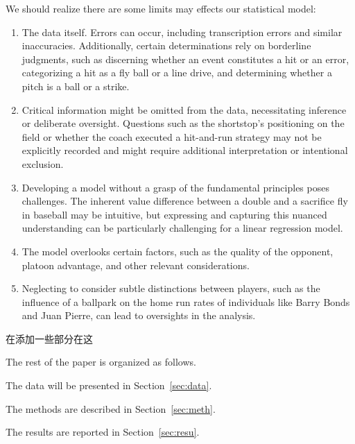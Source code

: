 \documentclass[12pt]{article}
\begin{document}
We should realize there are some limits may effects our statistical model:
\begin{enumerate}
\item The data itself. Errors can occur, including transcription errors and similar inaccuracies. Additionally, 
certain determinations rely on borderline judgments, such as discerning whether an event constitutes a hit or an
error, categorizing a hit as a fly ball or a line drive, and determining whether a pitch is a ball or a strike.

\item Critical information might be omitted from the data, necessitating inference or deliberate oversight. 
Questions such as the shortstop's positioning on the field or whether the coach executed a hit-and-run strategy may 
not be explicitly recorded and might require additional interpretation or intentional exclusion.

\item Developing a model without a grasp of the fundamental principles poses challenges. The inherent value
difference between a double and a sacrifice fly in baseball may be intuitive, but expressing and capturing this 
nuanced understanding can be particularly challenging for a linear regression model.

\item The model overlooks certain factors, such as the quality of the opponent, platoon advantage, and other 
relevant considerations.

\item Neglecting to consider subtle distinctions between players, such as the influence of a ballpark on the home 
run rates of individuals like Barry Bonds and Juan Pierre, can lead to oversights in the analysis.
\end{enumerate}


在添加一些部分在这

\cite*{web:Wyers:Part2}

The rest of the paper is organized as follows.

The data will be presented in Section~\ref{sec:data}.

The methods are described in Section~\ref{sec:meth}.

The results are reported in Section~\ref{sec:resu}.
\end{document}
